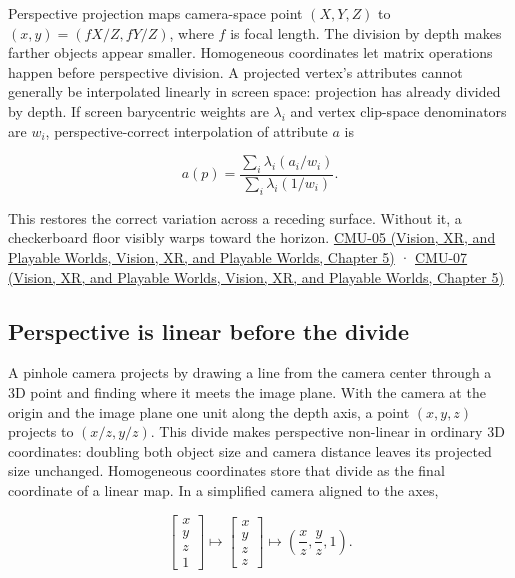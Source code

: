 Perspective projection maps camera-space point \((X,Y,Z)\) to \((x,y)=(fX/Z,fY/Z)\), where \(f\) is focal length. The division by depth makes farther objects appear smaller. Homogeneous coordinates let matrix operations happen before perspective division. A projected vertex's attributes cannot generally be interpolated linearly in screen space: projection has already divided by depth. If screen barycentric weights are \(\lambda_i\) and vertex clip-space denominators are \(w_i\), perspective-correct interpolation of attribute \(a\) is

\[
a(p)=\frac{\sum_i\lambda_i(a_i/w_i)}{\sum_i\lambda_i(1/w_i)}.
\]

This restores the correct variation across a receding surface. Without it, a checkerboard floor visibly warps toward the horizon. \href{../07-Vision-XR-and-Playable-Worlds/main.pdf\#nameddest=04-visual-computing-ii-ch036-cmu-05---spatial-transformations}{CMU-05 (Vision, XR, and Playable Worlds, Vision, XR, and Playable Worlds, Chapter 5)} · \href{../07-Vision-XR-and-Playable-Worlds/main.pdf\#nameddest=04-visual-computing-ii-ch036-cmu-07---perspective-projection-and-texture-mapping}{CMU-07 (Vision, XR, and Playable Worlds, Vision, XR, and Playable Worlds, Chapter 5)}

\subsection{Perspective is linear before the divide}\label{03-visual-computing-i-ch003-perspective-is-linear-before-the-divide}

A pinhole camera projects by drawing a line from the camera center through a 3D point and finding where it meets the image plane. With the camera at the origin and the image plane one unit along the depth axis, a point \((x,y,z)\) projects to \((x/z,y/z)\). This divide makes perspective non-linear in ordinary 3D coordinates: doubling both object size and camera distance leaves its projected size unchanged. Homogeneous coordinates store that divide as the final coordinate of a linear map. In a simplified camera aligned to the axes,

\[
\begin{bmatrix}x\\y\\z\\1\end{bmatrix}
\longmapsto
\begin{bmatrix}x\\y\\z\\z\end{bmatrix}
\longmapsto
\left(\frac{x}{z},\frac{y}{z},1\right).
\]

